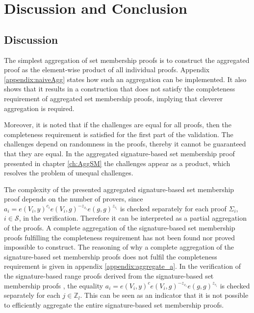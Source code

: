 \chapter{Discussion and Conclusion}
\label{ch:Conslusion}
\section*{Discussion}
The simplest aggregation of set membership proofs is to construct the aggregated proof as the element-wise product of all individual proofs. Appendix \ref{appendix:naiveAgg} states how such an aggregation can be implemented. It also shows that it results in a construction that does not satisfy the completeness requirement of aggregated set membership proofs, implying that cleverer aggregation is required.

 Moreover, it is noted that if the challenges are equal for all proofs, then the completeness requirement is satisfied for the  first part of the validation. The challenges depend on randomness in the proofs, thereby it cannot be guaranteed that they are equal. In the aggregated signature-based set membership proof presented in chapter \ref{ch:AggSM} the challenges appear as a product, which resolves the problem of unequal challenges.

The complexity of the presented aggregated signature-based set membership proof depends on the number of provers, since  $a_i= e(V_i,y)^{c_i} e(V_i,g)^{-z_{x_i}}e(g,g)^{z_{\tau_i}}$ is checked separately for each proof $\Sigma_i$, $i\in\mathcal{S}$, in the verification. Therefore it can be interpreted as a partial aggregation  of the proofs. A complete aggregation of the signature-based set membership proofs fulfilling the completeness requirement has not been found nor proved impossible to construct. The reasoning of why a  complete aggregation of the signature-based set membership proofs does not fulfil the completeness requirement is given in appendix \ref{appendix:aggregate_a}. In the verification of the signature-based range proofs derived from the signature-based set membership proofs \cite{RANGE-SET}, the equality $a_i= e(V_i,y)^{c} e(V_i,g)^{-z_{x_i}}e(g,g)^{z_{\tau_i}}$ is checked separately for each $j\in\mathds{Z}_l$. This can be seen as an indicator that it is not possible to efficiently aggregate the entire signature-based set membership proofs. 

